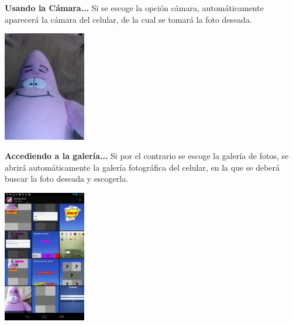 \documentclass[12pt]{report}
\begin{document}
\begingroup
		\large{
			\textbf{
				Usando la Cámara...
				\newline
				\newline
			}
		}
	\endgroup
Si se escoge la opción cámara, automáticamente aparecerá la cámara del celular, de la cual se tomará la foto deseada.
\newline
\newline
\newline
	\begin{center}
		\begingroup
			\includegraphics[width=0.27\textwidth]{imagenes_usuario/foto.jpg}
		\endgroup
	\end{center}



\begingroup
		\large{
			\textbf{
				Accediendo a la galería...
				\newline
				\newline
			}
		}
	\endgroup
Si por el contrario se escoge la galería de fotos, se abrirá automáticamente la galería fotográfica del celular, en la que se deberá buscar la foto deseada y escogerla.
\newline
\newline
	\begin{center}
		\begingroup
			\includegraphics[width=0.27\textwidth]{imagenes_usuario/galeria.png}
		\endgroup
	\end{center}
\end{document}
